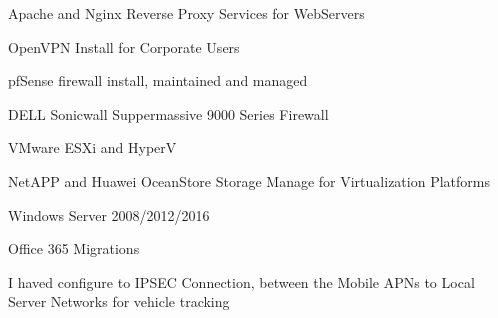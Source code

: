\begin{cventries}
{\begin{cvitems}
        \item {Apache and Nginx Reverse Proxy Services for WebServers}
        \item {OpenVPN Install for Corporate Users}
        \item {pfSense firewall install, maintained and managed}
        \item {DELL Sonicwall Suppermassive 9000 Series Firewall}
        \item {VMware ESXi and HyperV}
        \item {NetAPP and Huawei OceanStore Storage Manage for Virtualization Platforms}
        \item {Windows Server 2008/2012/2016}
        \item {Office 365 Migrations}
        \item {I haved configure to IPSEC Connection, between the Mobile APNs to Local Server Networks for vehicle tracking}
      \end{cvitems} 
    }
\end{cventries}